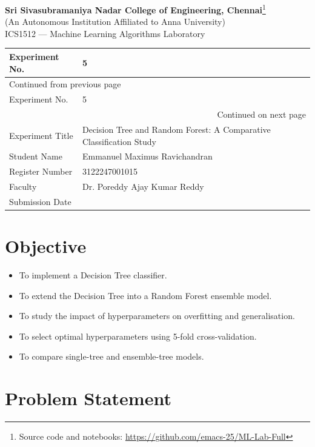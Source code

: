 \documentclass[11pt]{article}
\author{root}
\date{\today}
\title{}
\begin{document}
\begin{center}{\Large\bfseries Sri Sivasubramaniya Nadar College of Engineering, Chennai}\footnote{Source code and notebooks: \url{https://github.com/emacs-25/ML-Lab-Full}}\\[2pt]
(An Autonomous Institution Affiliated to Anna University)\\[2pt]
{\large ICS1512 --- Machine Learning Algorithms Laboratory}\end{center}

\begin{longtable}{|p{4cm}|p{11cm}|}
\hline
Experiment No. & 5\\[0pt]
\hline
\endfirsthead
\multicolumn{2}{l}{Continued from previous page} \\[0pt]
\hline

Experiment No. & 5 \\[0pt]

\hline
\endhead
\hline\multicolumn{2}{r}{Continued on next page} \\
\endfoot
\endlastfoot
\hline
Experiment Title & Decision Tree and Random Forest: A Comparative Classification Study\\[0pt]
\hline
Student Name & Emmanuel Maximus Ravichandran\\[0pt]
\hline
Register Number & 3122247001015\\[0pt]
\hline
Faculty & Dr. Poreddy Ajay Kumar Reddy\\[0pt]
\hline
Submission Date & \\[0pt]
\hline
\end{longtable}

\section*{Objective}
\label{sec:org4d193ab}


\begin{itemize}
\item To implement a Decision Tree classifier.
\item To extend the Decision Tree into a Random Forest ensemble model.
\item To study the impact of hyperparameters on overfitting and generalisation.
\item To select optimal hyperparameters using 5-fold cross-validation.
\item To compare single-tree and ensemble-tree models.
\end{itemize}

\section*{Problem Statement}
\label{sec:orge956f28}
\end{document}

